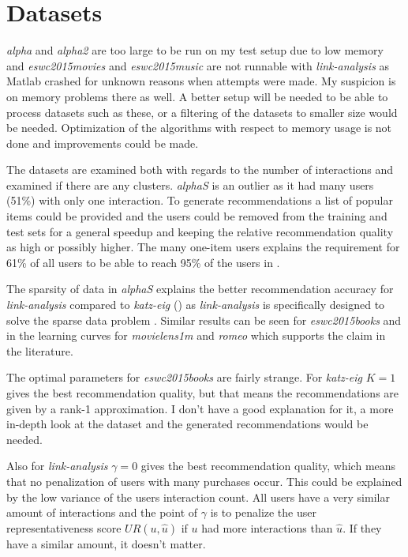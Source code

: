 \section{Datasets}

\textit{alpha} and \textit{alpha2} are too large to be run on my test setup due to low memory and \textit{eswc2015movies} and \textit{eswc2015music} are not runnable with \textit{link-analysis} as Matlab crashed for unknown reasons when attempts were made. My suspicion is on memory problems there as well. A better setup will be needed to be able to process datasets such as these, or a filtering of the datasets to smaller size would be needed. Optimization of the algorithms with respect to memory usage is not done and improvements could be made.

The datasets are examined both with regards to the number of interactions and examined if there are any clusters. \textit{alphaS} is an outlier as it had many users (51\%) with only one interaction. To generate recommendations a list of popular items could be provided and the users could be removed from the training and test sets for a general speedup and keeping the relative recommendation quality as high or possibly higher. The many one-item users explains the requirement for 61\% of all users to be able to reach 95\% of the users in .

The sparsity of data in \textit{alphaS} explains the better recommendation accuracy for \textit{link-analysis} compared to \textit{katz-eig} () as \textit{link-analysis} is specifically designed to solve the sparse data problem \citep{huang2004link, huang2007comparison}. Similar results can be seen for \textit{eswc2015books} and in the learning curves for \textit{movielens1m} and \textit{romeo} which supports the claim in the literature.

The optimal parameters for \textit{eswc2015books} are fairly strange. For \textit{katz-eig} $K = 1$ gives the best recommendation quality, but that means the recommendations are given by a rank-1 approximation. I don't have a good explanation for it, a more in-depth look at the dataset and the generated recommendations would be needed.

Also for \textit{link-analysis} $\gamma = 0$ gives the best recommendation quality, which means that no penalization of users with many purchases occur. This could be explained by the low variance of the users interaction count. All users have a very similar amount of interactions and the point of $\gamma$ is to penalize the user representativeness score $UR(u, \hat{u})$ if $u$ had more interactions than $\hat{u}$. If they have a similar amount, it doesn't matter.


